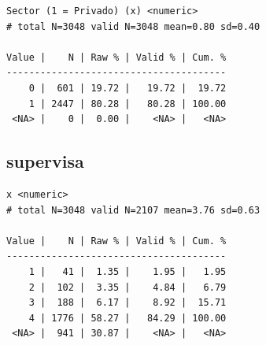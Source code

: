 \documentclass[
  letterpaper,
  DIV=11,
  numbers=noendperiod]{scrreprt}
\newenvironment{Shaded}{\begin{snugshade}}{\end{snugshade}}
\newcommand{\AttributeTok}[1]{\textcolor[rgb]{0.40,0.45,0.13}{#1}}
\newcommand{\DecValTok}[1]{\textcolor[rgb]{0.68,0.00,0.00}{#1}}
\newcommand{\FunctionTok}[1]{\textcolor[rgb]{0.28,0.35,0.67}{#1}}
\newcommand{\NormalTok}[1]{\textcolor[rgb]{0.00,0.23,0.31}{#1}}
\newcommand{\OtherTok}[1]{\textcolor[rgb]{0.00,0.23,0.31}{#1}}
\newcommand{\SpecialCharTok}[1]{\textcolor[rgb]{0.37,0.37,0.37}{#1}}
\newcommand{\StringTok}[1]{\textcolor[rgb]{0.13,0.47,0.30}{#1}}
\begin{document}
\begin{Shaded}
\end{Shaded}

\begin{verbatim}
Sector (1 = Privado) (x) <numeric> 
# total N=3048 valid N=3048 mean=0.80 sd=0.40

Value |    N | Raw % | Valid % | Cum. %
---------------------------------------
    0 |  601 | 19.72 |   19.72 |  19.72
    1 | 2447 | 80.28 |   80.28 | 100.00
 <NA> |    0 |  0.00 |    <NA> |   <NA>
\end{verbatim}

\hypertarget{supervisa}{%
\subsection{supervisa}\label{supervisa}}

\begin{Shaded}
\end{Shaded}

\begin{verbatim}
x <numeric> 
# total N=3048 valid N=2107 mean=3.76 sd=0.63

Value |    N | Raw % | Valid % | Cum. %
---------------------------------------
    1 |   41 |  1.35 |    1.95 |   1.95
    2 |  102 |  3.35 |    4.84 |   6.79
    3 |  188 |  6.17 |    8.92 |  15.71
    4 | 1776 | 58.27 |   84.29 | 100.00
 <NA> |  941 | 30.87 |    <NA> |   <NA>
\end{verbatim}
\end{document}
